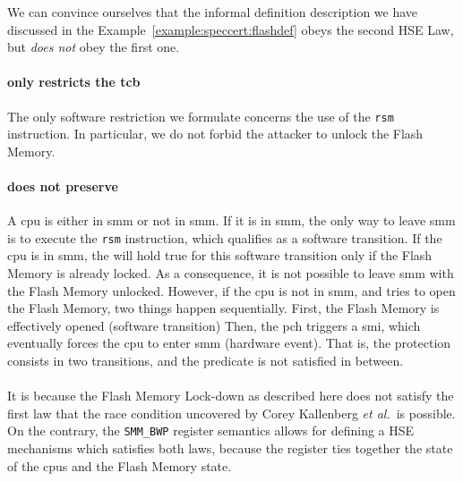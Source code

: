\begin{example}
  We can convince ourselves that the informal definition description we have
  discussed in the Example~\ref{example:speccert:flashdef} obeys the second HSE
  Law, but \emph{does not} obey the first one.
  \paragraph{ only restricts the \ac{tcb}}
  The only software restriction we formulate concerns the use of the
  \texttt{rsm} instruction.
  In particular, we do not forbid the attacker to unlock the Flash Memory.

  \paragraph{ does not preserve }
  A \ac{cpu} is either in \ac{smm} or not in \ac{smm}.
  If it is in \ac{smm}, the only way to leave \ac{smm} is to execute the
  \texttt{rsm} instruction, which qualifies as a software transition.
  If the \ac{cpu} is in \ac{smm}, the  will hold true for this
  software transition only if the Flash Memory is already locked.
  As a consequence, it is not possible to leave \ac{smm} with the Flash Memory
  unlocked.
  However, if the \ac{cpu} is not in \ac{smm}, and tries to open the Flash
  Memory, two things happen sequentially.
  First, the Flash Memory is effectively opened (software transition)
  Then, the \ac{pch} triggers a \ac{smi}, which eventually forces the \ac{cpu}
  to enter \ac{smm} (hardware event).
  That is, the protection consists in two transitions, and the 
  predicate is not satisfied in between.

  \paragraph{}
  It is because the Flash Memory Lock-down as described here does not satisfy
  the first law that the race condition uncovered by Corey Kallenberg \emph{et
    al.}\,\cite{kallenberg2015racecondition} is possible.
  On the contrary, the \texttt{SMM\_BWP} register semantics allows for defining
  a HSE mechanisms which satisfies both laws, because the register ties together
  the state of the \acp{cpu} and the Flash Memory state.
\end{example}

